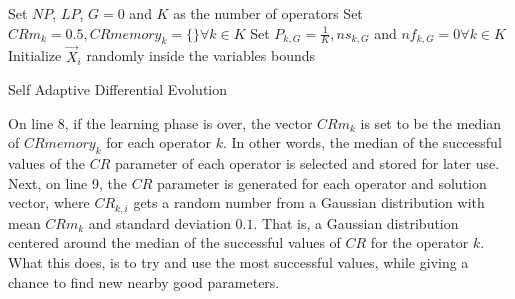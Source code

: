 \begin{algorithm}[ht]
\SetAlgoLined
Set $NP$, $LP$, $G=0$ and $K$ as the number of operators\;
Set $CRm_k = 0.5, CRmemory_k = \{\} \forall k \in K$\;
Set $P_{k,G} = \frac{1}{K}, ns_{k,G}$ and $nf_{k, G} = 0 \forall k \in K$\;
Initialize $\Vec{X}_i$ randomly inside the variables bounds\;
    \caption{Self Adaptive Differential Evolution}
    \label{algo:sade}
\end{algorithm}

On line 8, if the learning phase is over, the vector $CRm_k$ is set to be
the median of $CRmemory_k$ for each operator $k$. In other words, the median of
the successful values of the $CR$ parameter of each operator is selected and stored
for later use. Next, on line 9, the $CR$ parameter is generated for each 
operator and solution vector, where $CR_{k,i}$ gets a random number from
a Gaussian distribution with mean $CRm_k$ and standard deviation $0.1$.
That is, a Gaussian distribution centered around the median of the successful
values of $CR$ for the operator $k$. What this does, is to try and use the 
most successful values, while giving a chance to find new nearby
good parameters.

